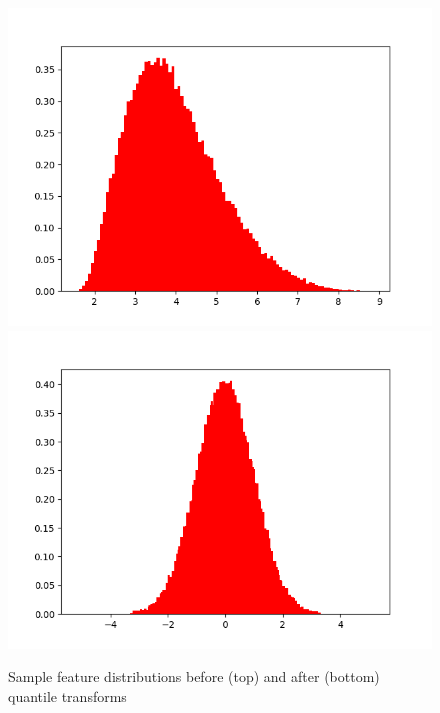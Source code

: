 \begin{figure}[H]
\begin{minipage}{.3\textwidth}
                \centering
                \includegraphics[width=.99\textwidth,trim={3cm 0 0 0},clip]{Chapters/Ch3-Simulations/normalizing_flows/pics/MeetingFigures/Bobby/QT/feature2_noQT.png}
                \includegraphics[width=.99\textwidth,trim={3cm 0 0 0},clip]{Chapters/Ch3-Simulations/normalizing_flows/pics/MeetingFigures/Bobby/QT/feature2.png}
        
            \end{minipage}%
            \caption[Data Pre-processing Quantile Transforms]{Sample feature distributions before (top) and after (bottom) quantile transforms}
            \label{fig:quantile_transforms}
        \end{figure}



